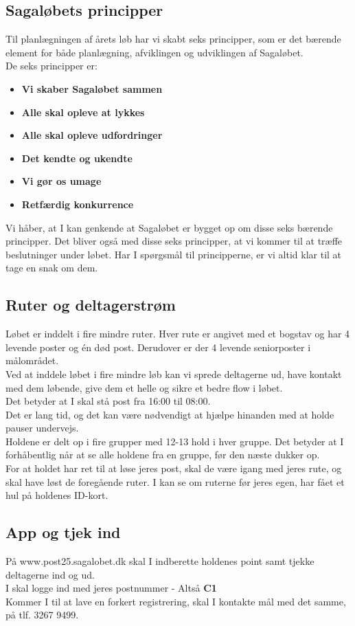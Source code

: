 \subsection{Sagaløbets principper}
Til planlægningen af årets løb har vi skabt seks principper, som er det bærende element for både planlægning, afviklingen og udviklingen af Sagaløbet.\\
De seks principper er:
\begin{itemize}
  \item \textbf{Vi skaber Sagaløbet sammen}
  \item \textbf{Alle skal opleve at lykkes}
  \item \textbf{Alle skal opleve udfordringer}
  \item \textbf{Det kendte og ukendte}
  \item \textbf{Vi gør os umage}
  \item \textbf{Retfærdig konkurrence}
\end{itemize}
Vi håber, at I kan genkende at Sagaløbet er bygget op om disse seks bærende principper. Det bliver også med disse seks principper, at vi kommer til at træffe beslutninger under løbet. Har I spørgsmål til principperne, er vi altid klar til at tage en snak om dem.
\subsection{Ruter og deltagerstrøm}
Løbet er inddelt i fire mindre ruter. Hver rute er angivet med et bogstav og har 4 levende poster og én død post. Derudover er der 4 levende seniorposter i målområdet.\\
Ved at inddele løbet i fire mindre løb kan vi sprede deltagerne ud, have kontakt med dem løbende, give dem et helle og sikre et bedre flow i løbet.\\
\newline
Det betyder at I skal stå post fra 16:00 til 08:00.\\
Det er lang tid, og det kan være nødvendigt at hjælpe hinanden med at holde pauser undervejs.\\
\newline
Holdene er delt op i fire grupper med 12-13 hold i hver gruppe. Det betyder at I forhåbentlig når at se alle holdene fra en gruppe, før den næste dukker op.\\
For at holdet har ret til at løse jeres post, skal de være igang med jeres rute, og skal have løst de foregående ruter. I kan se om ruterne før jeres egen, har fået et hul på holdenes ID-kort.
\subsection{App og tjek ind}
På www.post25.sagalobet.dk skal I indberette holdenes point samt tjekke deltagerne ind og ud.\\
I skal logge ind med jeres postnummer - Altså \textbf{C1}\\
\newline
Kommer I til at lave en forkert registrering, skal I kontakte mål med det samme, på tlf. 3267 9499.
\newpage
\vspace*{.4cm}
